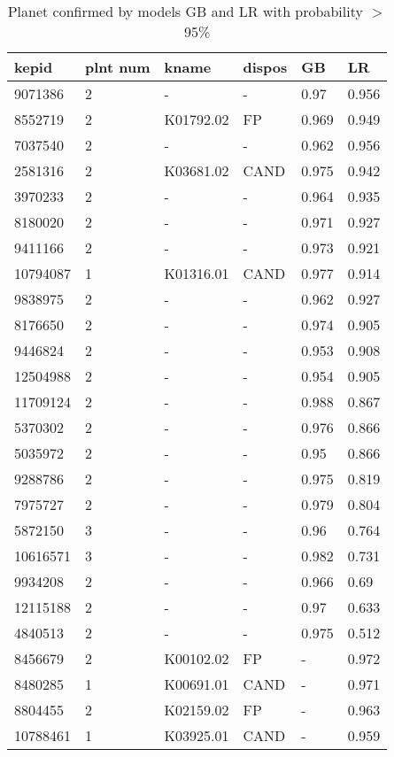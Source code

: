 \begin{table}[!htbp]
 \centering
 \caption{Planet confirmed by models GB and LR with probability $>$ 95\%}
 \label{dataGBLRcreftab} 
  \begin{tabular}
{| 
 p{}| 
 p{}| 
 p{}| 
 p{}| 
 p{}| 
 p{}| 
}\hline 
\textbf{kepid} &\textbf{plnt num} &\textbf{kname} &\textbf{dispos} &\textbf{GB} &\textbf{LR} \\ \hline 
9071386 &2 &- &- &0.97 &0.956 \\ \hline 
8552719 &2 &K01792.02 &FP &0.969 &0.949 \\ \hline 
7037540 &2 &- &- &0.962 &0.956 \\ \hline 
2581316 &2 &K03681.02 &CAND &0.975 &0.942 \\ \hline 
3970233 &2 &- &- &0.964 &0.935 \\ \hline 
8180020 &2 &- &- &0.971 &0.927 \\ \hline 
9411166 &2 &- &- &0.973 &0.921 \\ \hline 
10794087 &1 &K01316.01 &CAND &0.977 &0.914 \\ \hline 
9838975 &2 &- &- &0.962 &0.927 \\ \hline 
8176650 &2 &- &- &0.974 &0.905 \\ \hline 
9446824 &2 &- &- &0.953 &0.908 \\ \hline 
12504988 &2 &- &- &0.954 &0.905 \\ \hline 
11709124 &2 &- &- &0.988 &0.867 \\ \hline 
5370302 &2 &- &- &0.976 &0.866 \\ \hline 
5035972 &2 &- &- &0.95 &0.866 \\ \hline 
9288786 &2 &- &- &0.975 &0.819 \\ \hline 
7975727 &2 &- &- &0.979 &0.804 \\ \hline 
5872150 &3 &- &- &0.96 &0.764 \\ \hline 
10616571 &3 &- &- &0.982 &0.731 \\ \hline 
9934208 &2 &- &- &0.966 &0.69 \\ \hline 
12115188 &2 &- &- &0.97 &0.633 \\ \hline 
4840513 &2 &- &- &0.975 &0.512 \\ \hline 
8456679 &2 &K00102.02 &FP &- &0.972 \\ \hline 
8480285 &1 &K00691.01 &CAND &- &0.971 \\ \hline 
8804455 &2 &K02159.02 &FP &- &0.963 \\ \hline 
10788461 &1 &K03925.01 &CAND &- &0.959 \\ \hline 
\end{tabular} 
\end{table}